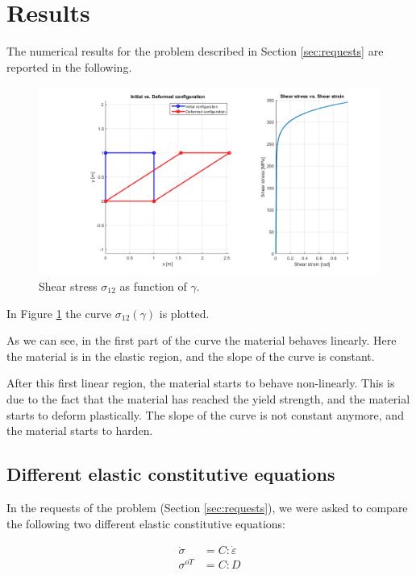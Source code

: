 \section{Results}
\label{sec:results}

The numerical results for the problem described in Section \ref{sec:requests} are reported in the following.

\begin{figure}[H]
    \centering
    \includegraphics[width=\textwidth]{./img/stress_vs_strain.png}
    \caption{Shear stress $\sigma_{12}$ as function of $\gamma$.}
    \label{fig:stress_vs_strain}
\end{figure}

In Figure \ref{fig:stress_vs_strain} the curve $\sigma_{12}(\gamma)$ is plotted.

As we can see, in the first part of the curve the material behaves linearly.
Here the material is in the elastic region, and the slope of the curve is constant.

After this first linear region, the material starts to behave non-linearly.
This is due to the fact that the material has reached the yield strength, and the material starts to deform plastically.
The slope of the curve is not constant anymore, and the material starts to harden.


\subsection{Different elastic constitutive equations}

In the requests of the problem (Section \ref{sec:requests}), we were asked to compare the following two different elastic constitutive equations:

\begin{align}
    \dot{\sigma} & = C : \dot{\varepsilon} \\
    \sigma^{oT}  & = C: D
\end{align}

